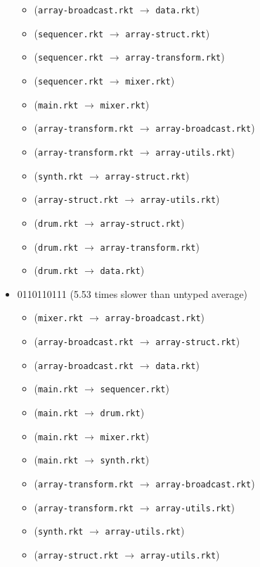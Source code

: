\documentclass{article}
\newcommand{\mono}[1]{\texttt{#1}}
\begin{document}
\begin{itemize}
\begin{itemize}
  \item (\mono{array-broadcast.rkt} $\rightarrow$ \mono{data.rkt})
  \item (\mono{sequencer.rkt} $\rightarrow$ \mono{array-struct.rkt})
  \item (\mono{sequencer.rkt} $\rightarrow$ \mono{array-transform.rkt})
  \item (\mono{sequencer.rkt} $\rightarrow$ \mono{mixer.rkt})
  \item (\mono{main.rkt} $\rightarrow$ \mono{mixer.rkt})
  \item (\mono{array-transform.rkt} $\rightarrow$ \mono{array-broadcast.rkt})
  \item (\mono{array-transform.rkt} $\rightarrow$ \mono{array-utils.rkt})
  \item (\mono{synth.rkt} $\rightarrow$ \mono{array-struct.rkt})
  \item (\mono{array-struct.rkt} $\rightarrow$ \mono{array-utils.rkt})
  \item (\mono{drum.rkt} $\rightarrow$ \mono{array-struct.rkt})
  \item (\mono{drum.rkt} $\rightarrow$ \mono{array-transform.rkt})
  \item (\mono{drum.rkt} $\rightarrow$ \mono{data.rkt})
  \end{itemize}
\item 0110110111 (5.53 times slower than untyped average)
  \begin{itemize}
  \item (\mono{mixer.rkt} $\rightarrow$ \mono{array-broadcast.rkt})
  \item (\mono{array-broadcast.rkt} $\rightarrow$ \mono{array-struct.rkt})
  \item (\mono{array-broadcast.rkt} $\rightarrow$ \mono{data.rkt})
  \item (\mono{main.rkt} $\rightarrow$ \mono{sequencer.rkt})
  \item (\mono{main.rkt} $\rightarrow$ \mono{drum.rkt})
  \item (\mono{main.rkt} $\rightarrow$ \mono{mixer.rkt})
  \item (\mono{main.rkt} $\rightarrow$ \mono{synth.rkt})
  \item (\mono{array-transform.rkt} $\rightarrow$ \mono{array-broadcast.rkt})
  \item (\mono{array-transform.rkt} $\rightarrow$ \mono{array-utils.rkt})
  \item (\mono{synth.rkt} $\rightarrow$ \mono{array-utils.rkt})
  \item (\mono{array-struct.rkt} $\rightarrow$ \mono{array-utils.rkt})

\end{itemize}
\end{itemize}
\end{document}
